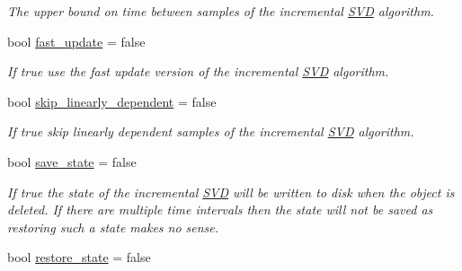 \begin{DoxyCompactItemize}
\begin{DoxyCompactList}\small\item\em The upper bound on time between samples of the incremental \hyperlink{class_c_a_r_o_m_1_1_s_v_d}{S\-V\-D} algorithm. \end{DoxyCompactList}\item 
\hypertarget{class_c_a_r_o_m_1_1_options_a9d5f92693f84d6bb43653efafe81f8a0}{bool \hyperlink{class_c_a_r_o_m_1_1_options_a9d5f92693f84d6bb43653efafe81f8a0}{fast\-\_\-update} = false}\label{class_c_a_r_o_m_1_1_options_a9d5f92693f84d6bb43653efafe81f8a0}

\begin{DoxyCompactList}\small\item\em If true use the fast update version of the incremental \hyperlink{class_c_a_r_o_m_1_1_s_v_d}{S\-V\-D} algorithm. \end{DoxyCompactList}\item 
\hypertarget{class_c_a_r_o_m_1_1_options_abb8146fb15a83f240c5339d7f7595617}{bool \hyperlink{class_c_a_r_o_m_1_1_options_abb8146fb15a83f240c5339d7f7595617}{skip\-\_\-linearly\-\_\-dependent} = false}\label{class_c_a_r_o_m_1_1_options_abb8146fb15a83f240c5339d7f7595617}

\begin{DoxyCompactList}\small\item\em If true skip linearly dependent samples of the incremental \hyperlink{class_c_a_r_o_m_1_1_s_v_d}{S\-V\-D} algorithm. \end{DoxyCompactList}\item 
\hypertarget{class_c_a_r_o_m_1_1_options_a64e8620da2a87b13635511589881e386}{bool \hyperlink{class_c_a_r_o_m_1_1_options_a64e8620da2a87b13635511589881e386}{save\-\_\-state} = false}\label{class_c_a_r_o_m_1_1_options_a64e8620da2a87b13635511589881e386}

\begin{DoxyCompactList}\small\item\em If true the state of the incremental \hyperlink{class_c_a_r_o_m_1_1_s_v_d}{S\-V\-D} will be written to disk when the object is deleted. If there are multiple time intervals then the state will not be saved as restoring such a state makes no sense. \end{DoxyCompactList}\item 
\hypertarget{class_c_a_r_o_m_1_1_options_a2a72a87c998cbebc89e87c7c1fd5928e}{bool \hyperlink{class_c_a_r_o_m_1_1_options_a2a72a87c998cbebc89e87c7c1fd5928e}{restore\-\_\-state} = false}\label{class_c_a_r_o_m_1_1_options_a2a72a87c998cbebc89e87c7c1fd5928e}


\end{DoxyCompactItemize}
